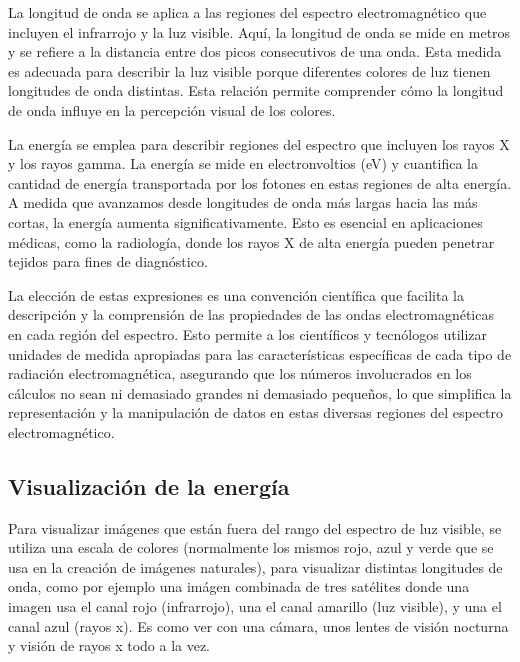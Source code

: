 \documentclass[a4paper,12pt]{article}
\begin{document}
\begin{multicols*}{2}
La longitud de onda se aplica a las regiones del espectro electromagnético que incluyen el infrarrojo y la luz visible. Aquí, la longitud de onda se mide en metros y se refiere a la distancia entre dos picos consecutivos de una onda. Esta medida es adecuada para describir la luz visible porque diferentes colores de luz tienen longitudes de onda distintas. Esta relación permite comprender cómo la longitud de onda influye en la percepción visual de los colores.

La energía se emplea para describir regiones del espectro que incluyen los rayos X y los rayos gamma. La energía se mide en electronvoltios (eV) y cuantifica la cantidad de energía transportada por los fotones en estas regiones de alta energía. A medida que avanzamos desde longitudes de onda más largas hacia las más cortas, la energía aumenta significativamente. Esto es esencial en aplicaciones médicas, como la radiología, donde los rayos X de alta energía pueden penetrar tejidos para fines de diagnóstico.

La elección de estas expresiones es una convención científica que facilita la descripción y la comprensión de las propiedades de las ondas electromagnéticas en cada región del espectro. Esto permite a los científicos y tecnólogos utilizar unidades de medida apropiadas para las características específicas de cada tipo de radiación electromagnética, asegurando que los números involucrados en los cálculos no sean ni demasiado grandes ni demasiado pequeños, lo que simplifica la representación y la manipulación de datos en estas diversas regiones del espectro electromagnético.

\subsection*{Visualización de la energía}

Para visualizar imágenes que están fuera del rango del espectro de luz visible, se utiliza una escala de colores (normalmente los mismos rojo, azul y verde que se usa en la creación de imágenes naturales), para visualizar distintas longitudes de onda, como por ejemplo una imágen combinada de tres satélites donde una imagen usa el canal rojo (infrarrojo), una el canal amarillo (luz visible), y una el canal azul (rayos x). Es como ver con una cámara, unos lentes de visión nocturna y visión de rayos x todo a la vez.


\end{multicols*}
\end{document}
